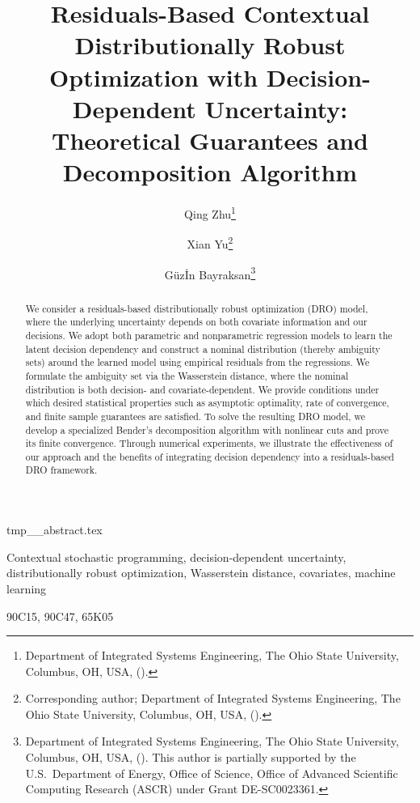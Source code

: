 \documentclass[onefignum,onetabnum]{siamart251216}
\title{Residuals-Based Contextual Distributionally Robust Optimization with Decision-Dependent Uncertainty: Theoretical Guarantees and Decomposition Algorithm}
\author{Qing Zhu\thanks{Department of Integrated Systems Engineering, The Ohio State University, Columbus, OH, USA, (\email{zhu.2166@osu.edu}).}
\and Xian Yu\thanks{Corresponding author; Department of Integrated Systems Engineering, The Ohio State University, Columbus, OH, USA,  (\email{yu.3610@osu.edu}).}
\and G\"uz\.{I}n Bayraksan\thanks{Department of Integrated Systems Engineering, The Ohio State University, Columbus, OH, USA, (\email{bayraksan.1@osu.edu}). This author is partially supported by the U.S.\ Department of Energy, Office of Science, Office of Advanced Scientific Computing Research (ASCR) under Grant DE-SC0023361.}}
\begin{document}
\maketitle

\begin{tcbverbatimwrite}{tmp_\jobname_abstract.tex}
\begin{abstract}
We consider a residuals-based distributionally robust optimization (DRO) model, where the underlying uncertainty depends on both covariate information and our decisions. 
We adopt both parametric and nonparametric regression models to learn the latent decision dependency and construct a nominal distribution (thereby ambiguity sets) around the learned model using empirical residuals from the regressions. 
We formulate the ambiguity set via the Wasserstein distance, where the nominal distribution is both decision- and covariate-dependent.  
We provide conditions under which desired statistical properties such as asymptotic optimality, rate of convergence, and finite sample guarantees are satisfied. To solve the resulting DRO model, we develop a specialized Bender's decomposition algorithm with nonlinear cuts and prove its finite convergence. Through numerical experiments, we illustrate the effectiveness of our approach and the benefits of integrating decision dependency into a residuals-based DRO framework.
\end{abstract}

\begin{keywords}
Contextual stochastic programming, decision-dependent uncertainty, distributionally robust optimization, Wasserstein distance, covariates, machine learning
\end{keywords}

\begin{MSCcodes}
90C15, 90C47, 65K05
\end{MSCcodes}

\end{tcbverbatimwrite}

\end{document}
